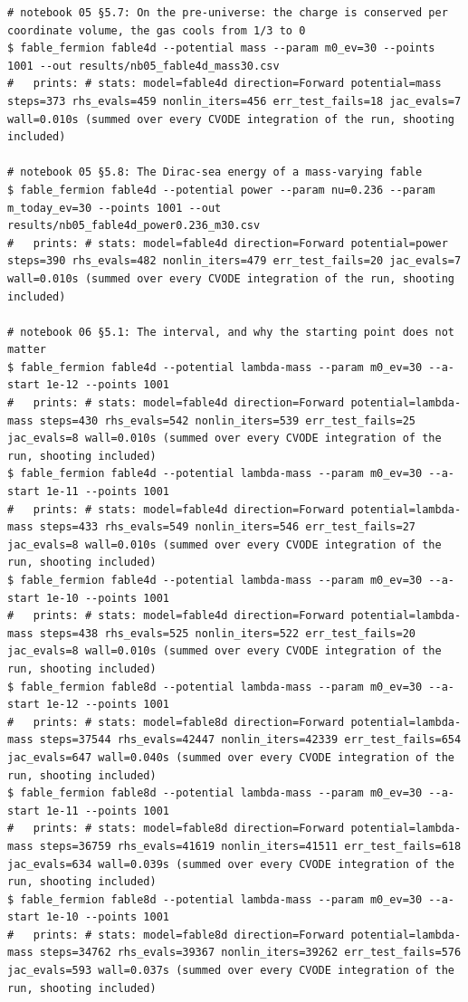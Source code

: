 \begin{Verbatim}
# notebook 05 §5.7: On the pre-universe: the charge is conserved per coordinate volume, the gas cools from 1/3 to 0
$ fable_fermion fable4d --potential mass --param m0_ev=30 --points 1001 --out results/nb05_fable4d_mass30.csv
#   prints: # stats: model=fable4d direction=Forward potential=mass steps=373 rhs_evals=459 nonlin_iters=456 err_test_fails=18 jac_evals=7 wall=0.010s (summed over every CVODE integration of the run, shooting included)

# notebook 05 §5.8: The Dirac-sea energy of a mass-varying fable
$ fable_fermion fable4d --potential power --param nu=0.236 --param m_today_ev=30 --points 1001 --out results/nb05_fable4d_power0.236_m30.csv
#   prints: # stats: model=fable4d direction=Forward potential=power steps=390 rhs_evals=482 nonlin_iters=479 err_test_fails=20 jac_evals=7 wall=0.010s (summed over every CVODE integration of the run, shooting included)

# notebook 06 §5.1: The interval, and why the starting point does not matter
$ fable_fermion fable4d --potential lambda-mass --param m0_ev=30 --a-start 1e-12 --points 1001
#   prints: # stats: model=fable4d direction=Forward potential=lambda-mass steps=430 rhs_evals=542 nonlin_iters=539 err_test_fails=25 jac_evals=8 wall=0.010s (summed over every CVODE integration of the run, shooting included)
$ fable_fermion fable4d --potential lambda-mass --param m0_ev=30 --a-start 1e-11 --points 1001
#   prints: # stats: model=fable4d direction=Forward potential=lambda-mass steps=433 rhs_evals=549 nonlin_iters=546 err_test_fails=27 jac_evals=8 wall=0.010s (summed over every CVODE integration of the run, shooting included)
$ fable_fermion fable4d --potential lambda-mass --param m0_ev=30 --a-start 1e-10 --points 1001
#   prints: # stats: model=fable4d direction=Forward potential=lambda-mass steps=438 rhs_evals=525 nonlin_iters=522 err_test_fails=20 jac_evals=8 wall=0.010s (summed over every CVODE integration of the run, shooting included)
$ fable_fermion fable8d --potential lambda-mass --param m0_ev=30 --a-start 1e-12 --points 1001
#   prints: # stats: model=fable8d direction=Forward potential=lambda-mass steps=37544 rhs_evals=42447 nonlin_iters=42339 err_test_fails=654 jac_evals=647 wall=0.040s (summed over every CVODE integration of the run, shooting included)
$ fable_fermion fable8d --potential lambda-mass --param m0_ev=30 --a-start 1e-11 --points 1001
#   prints: # stats: model=fable8d direction=Forward potential=lambda-mass steps=36759 rhs_evals=41619 nonlin_iters=41511 err_test_fails=618 jac_evals=634 wall=0.039s (summed over every CVODE integration of the run, shooting included)
$ fable_fermion fable8d --potential lambda-mass --param m0_ev=30 --a-start 1e-10 --points 1001
#   prints: # stats: model=fable8d direction=Forward potential=lambda-mass steps=34762 rhs_evals=39367 nonlin_iters=39262 err_test_fails=576 jac_evals=593 wall=0.037s (summed over every CVODE integration of the run, shooting included)


\end{Verbatim}
